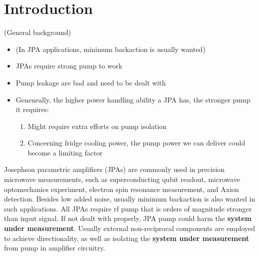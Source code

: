\documentclass[aip,reprint]{revtex4-2}
\begin{document}
\maketitle %

\section{Introduction}

(General background)
\begin{itemize}
	\item (In JPA applications, minimum backaction is usually wanted)
	\item JPAs require strong pump to work
	\item Pump leakage are bad and need to be dealt with
	\item Geneneally, the higher power handling ability a JPA has, the stronger pump it requires: 
	\begin{enumerate}
		\item Might require extra efforts on pump isolation
		\item Concerning fridge cooling power, the pump power we can deliver could become a limiting factor
	\end{enumerate}
\end{itemize}

Josephson parametric amplifiers (JPAs) are commonly used in precision microwave measurements, such as superconducting qubit readout, microwave optomechanics experiment, electron spin resonance measurement, and Axion detection. Besides low added noise, usually minimum backaction is also wanted in such applications. All JPAs require rf pump that is orders of magnitude stronger than input signal. If not dealt with properly, JPA pump could harm the \textbf{system under measurement}. Usually external non-reciprocal components are employed to achieve directionality, as well as isolating the \textbf{system under measurement} from pump in amplifier circuitry. 

\end{document}
